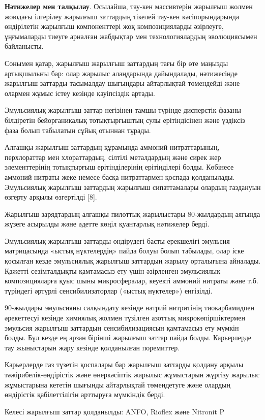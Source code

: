 {\bfseries Нәтижелер мен талқылау}. Осылайша, тау-кен массивтерін жарылғыш
жолмен жоюдағы ілгерілеу жарылғыш заттардың тікелей тау-кен
кәсіпорындарында өндірілетін жарылғыш компоненттері жоқ композицияларды
әзірлеуге, ұңғымаларды тиеуге арналған жабдықтар мен технологиялардың
эволюциясымен байланысты.

Сонымен қатар, жарылғыш жарылғыш заттардың тағы бір өте маңызды
артықшылығы бар: олар жарылыс алаңдарында дайындалады, нәтижесінде
жарылғыш заттарды тасымалдау шығындары айтарлықтай төмендейді және
олармен жұмыс істеу кезінде қауіпсіздік артады.

Эмульсиялық жарылғыш заттар негізінен тамшы түрінде дисперстік фазаны
білдіретін бейорганикалық тотықтырғыштың сулы ерітіндісінен және
үздіксіз фаза болып табылатын сұйық отыннан тұрады.

Алғашқы жарылғыш заттардың құрамында аммоний нитраттарының, перхлораттар
мен хлораттардың, сілтілі металдардың және сирек жер элементтерінің
тотықтырғыш ерітінділерінің ерітінділері болды. Көбінесе аммоний нитраты
жеке немесе басқа нитраттармен қоспада қолданылады. Эмульсиялық жарылғыш
заттардың жарылғыш сипаттамалары олардың газдануын өзгерту арқылы
өзгертілді {[}8{]}.

Жарылғыш зарядтардың алғашқы пилоттық жарылыстары 80-жылдардың аяғында
жүзеге асырылды және әдетте көңіл қуантарлық нәтижелер берді.

Эмульсиялық жарылғыш заттарды өндірудегі басты ерекшелігі эмульсия
матрицасында «ыстық нүктелердің» пайда болуы болып табылады, олар іске
қосылған кезде эмульсиялық жарылғыш заттардың жарылу орталығына
айналады. Қажетті сезімталдықты қамтамасыз ету үшін әзірленген
эмульсиялық композицияларға қуыс шыны микросфералар, кеуекті аммоний
нитраты және т.б. түріндегі әртүрлі сенсибилизаторлар («ыстық нүктелер»)
енгізілді.

90-жылдары эмульсияны салқындату кезінде натрий нитритінің
тиокарбамидпен әрекеттесуі кезінде химиялық жолмен түзілген азоттық
микрокөпіршіктермен эмульсия жарылғыш заттардың сенсибилизациясын
қамтамасыз ету мүмкін болды. Бұл кезде ең арзан бірінші жарылғыш заттар
пайда болды. Карьерлерде тау жыныстарын жару кезінде қолданылған
поремиттер.

Карьерлерде газ түзетін қоспалары бар жарылғыш заттарды қолдану арқылы
тәжірибелік-өндірістік және өнеркәсіптік жарылыс жұмыстарын жүргізу
жарылыс жұмыстарына кететін шығынды айтарлықтай төмендетуге және олардың
өндірістік қабілеттілігін арттыруға мүмкіндік берді.

Келесі жарылғыш заттар қолданылды: ANFO, Rioflex және Nitronit P

